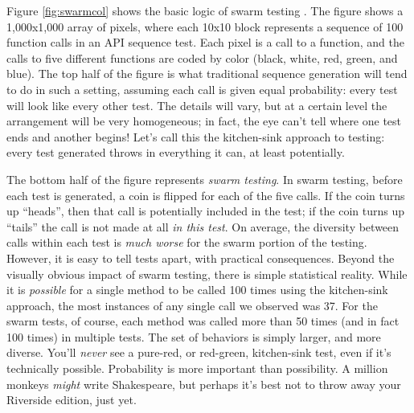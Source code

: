 \documentclass[sigplan,screen]{acmart}
\begin{document}
Figure \ref{fig:swarmcol} shows the basic logic of swarm testing
\cite{ISSTA12}.  The figure shows a 1,000x1,000 array of pixels, where
each 10x10 block represents a sequence of 100 function calls in
an API sequence test.  Each pixel is a call to a function, and the
calls to five different functions are coded by color (black, white,
red, green, and blue).  The top half of the figure is what traditional
sequence generation will tend to do in such a setting, assuming each
call is given equal probability:  every test will look like every
other test.  The details will vary, but at a certain level the
arrangement will be very homogeneous; in fact, the eye can't tell where
one test ends and another begins!  Let's call this the kitchen-sink
approach to testing:  every test generated throws in everything it can, at
least potentially.

The bottom half of the figure represents \emph{swarm testing}.  In
swarm testing, before each test is generated, a coin is flipped for
each of the five calls.  If the coin turns up ``heads'', then that
call is potentially included in the test; if the coin turns up
``tails'' the call is not made at all \emph{in this test}.  On
average, the diversity between calls within each test is \emph{much
  worse} for the swarm portion of the testing.  However, it is easy to
tell tests apart, with practical consequences.  Beyond the visually
obvious impact of swarm testing, there is simple statistical reality.
While it is \emph{possible} for a single method to be called 100 times
using the kitchen-sink approach, the most instances of any single call
we observed was 37.  For the swarm tests, of course, each method was
called more than 50 times (and in fact 100 times) in multiple tests.
The set of behaviors is simply larger, and more diverse.  You'll \emph{never}
see a pure-red, or red-green, kitchen-sink test, even if it's
technically possible.  Probability is more important than
possibility.  A million monkeys \emph{might} write Shakespeare, but
perhaps it's best not to throw away your Riverside edition, just yet.
\end{document}
